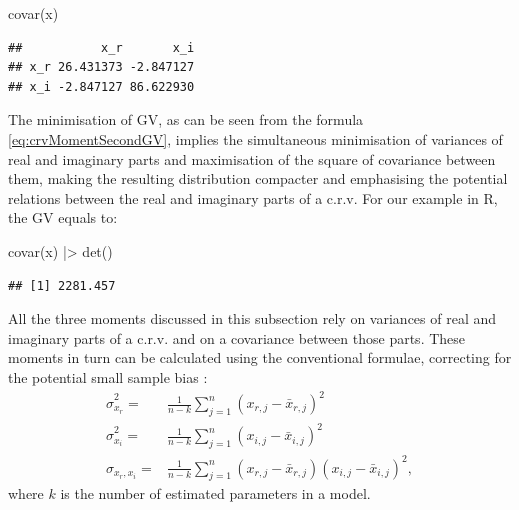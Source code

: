\documentclass[
]{book}
\newenvironment{Shaded}{\begin{snugshade}}{\end{snugshade}}
\newcommand{\FunctionTok}[1]{\textcolor[rgb]{0.00,0.00,0.00}{#1}}
\newcommand{\NormalTok}[1]{#1}
\newcommand{\SpecialCharTok}[1]{\textcolor[rgb]{0.00,0.00,0.00}{#1}}
\begin{document}
\begin{Shaded}
\begin{Highlighting}[]
\FunctionTok{covar}\NormalTok{(x)}
\end{Highlighting}
\end{Shaded}

\begin{verbatim}
##           x_r       x_i
## x_r 26.431373 -2.847127
## x_i -2.847127 86.622930
\end{verbatim}

The minimisation of GV, as can be seen from the formula \eqref{eq:crvMomentSecondGV}, implies the simultaneous minimisation of variances of real and imaginary parts and maximisation of the square of covariance between them, making the resulting distribution compacter and emphasising the potential relations between the real and imaginary parts of a c.r.v. For our example in R, the GV equals to:

\begin{Shaded}
\begin{Highlighting}[]
\FunctionTok{covar}\NormalTok{(x) }\SpecialCharTok{|\textgreater{}} \FunctionTok{det}\NormalTok{()}
\end{Highlighting}
\end{Shaded}

\begin{verbatim}
## [1] 2281.457
\end{verbatim}

All the three moments discussed in this subsection rely on variances of real and imaginary parts of a c.r.v. and on a covariance between those parts. These moments in turn can be calculated using the conventional formulae, correcting for the potential small sample bias \citep{referenceSBA}:
\begin{equation}
    \begin{aligned}
        \hat{\sigma}_{x_r}^2 = & \frac{1}{n-k} \sum_{j=1}^n (x_{r,j}-\bar{x}_{r,j})^2 \\
        \hat{\sigma}_{x_i}^2 = & \frac{1}{n-k} \sum_{j=1}^n (x_{i,j}-\bar{x}_{i,j})^2 \\
        \hat{\sigma}_{x_r, x_i} = & \frac{1}{n-k} \sum_{j=1}^n (x_{r,j}-\bar{x}_{r,j})(x_{i,j}-\bar{x}_{i,j})^2 ,
    \end{aligned}
    \label{eq:crvMomentSecondSample}
\end{equation}
where \(k\) is the number of estimated parameters in a model.
\end{document}

